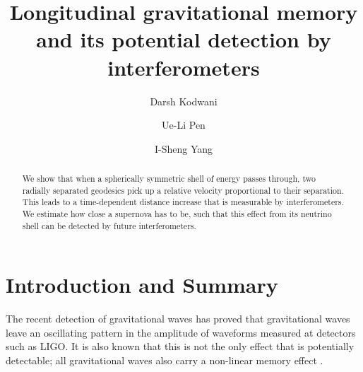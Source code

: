\documentclass[aps,showpacs,twocolumn,floats,prd,superscriptaddress,nofootinbib]{revtex4-1}
\begin{document}
\title{Longitudinal gravitational memory and its potential detection by interferometers}

\author{Darsh Kodwani}

\author{Ue-Li Pen}

\author{I-Sheng Yang}

\begin{abstract}
We show that when a spherically symmetric shell of energy passes through, two radially separated geodesics pick up a relative velocity proportional to their separation. This leads to a time-dependent distance increase that is measurable by interferometers. We estimate how close a supernova has to be, such that this effect from its neutrino shell can be detected by future interferometers. 
\end{abstract}

\maketitle

\section{Introduction and Summary}

The recent detection of gravitational waves \cite{GW1509} has proved that gravitational waves leave an oscillating pattern in the amplitude of waveforms measured at detectors such as LIGO. It is also known that this is not the only effect that is potentially detectable; all gravitational waves also carry a non-linear memory effect \cite{Christodoulou_effect}. 
\end{document}
